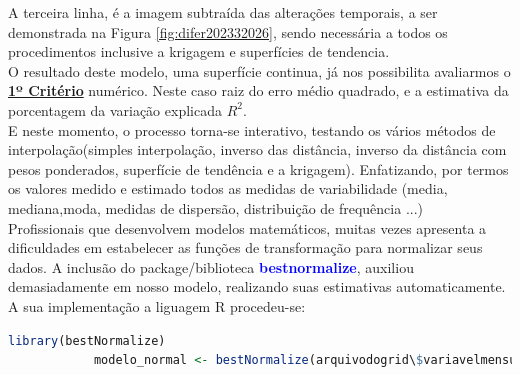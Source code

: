 		\hspace*{1.25 cm}  A terceira linha, é a imagem subtraída das alterações temporais, a ser demonstrada na Figura \ref{fig:difer202332026}, sendo necessária a todos os procedimentos inclusive a krigagem e superfícies de tendencia.\\
		\hspace*{1.25 cm}  O resultado deste modelo, uma superfície continua, já nos possibilita avaliarmos o \textbf{\underline{1º Critério}} numérico. Neste caso raiz do erro médio quadrado, e a estimativa da porcentagem da variação explicada $ R^{2}$.\\
		\hspace*{1.25 cm}  E neste momento, o processo torna-se interativo, testando os vários métodos de interpolação(simples interpolação, inverso das distância, inverso da distância com pesos ponderados, superfície de tendência e a krigagem). Enfatizando, por  termos os valores medido e estimado todos as medidas de variabilidade (media, mediana,moda, medidas de dispersão, distribuição de frequência ...)  \\
		\hspace*{1.25 cm}  Profissionais que desenvolvem modelos matemáticos, muitas vezes apresenta a dificuldades em estabelecer as funções de transformação para normalizar seus dados. A inclusão  do package/biblioteca \textbf{\textcolor{blue}{bestnormalize}}, auxiliou demasiadamente em nosso modelo, realizando suas estimativas automaticamente. A sua implementação a liguagem R procedeu-se:
		\lstset{
			language=R, %
			caption= normalizacao do modelo em linguagem R,} %
		\begin{lstlisting}[language=R]
			library(bestNormalize)
			modelo_normal <- bestNormalize(arquivodogrid\$variavelmensurada )
		\end{lstlisting}  
		
